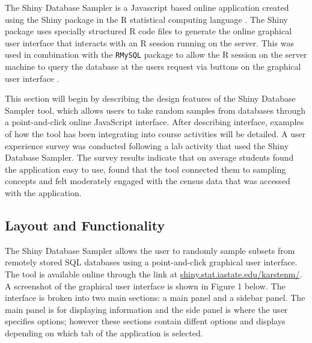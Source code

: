 \documentclass{article}\usepackage[]{graphicx}\usepackage[]{color}
\newcommand{\km}[1]{{\color{Orange} #1}}
\begin{document}
\km{  The Shiny Database Sampler is a Javascript based online application created using the Shiny package in the R statistical computing language \citep{shiny}. The Shiny package uses specially structured R code files to generate the online graphical user interface that interacts with an R session running on the server.  This was used in combination with the \texttt{RMySQL} package to allow the R session on the server machine to query the database at the users request via buttons on the graphical user interface \citep{RMySQL}.  \\  }

\km{  This section will begin by describing the design features of the Shiny Database Sampler tool, which allows users to take random samples from databases through a point-and-click online JavaScript interface.  After describing interface, examples of how the tool has been integrating into course activities will be detailed. A user experience survey was conducted following a lab activity that used the Shiny Database Sampler.  The survey results indicate that on average students found the application easy to use, found that the tool connected them to sampling concepts and felt moderately engaged with the census data that was accessed with the application. \\  }


\subsection{Layout and Functionality}

The Shiny Database Sampler allows the user to randomly sample subsets from remotely stored SQL databases using a point-and-click graphical user interface. The tool is available online through the link at \url{shiny.stat.iastate.edu/karstenm/}.  A screenshot of the graphical user interface is shown in Figure 1 below.  The interface is broken into two main sections: a main panel and a sidebar panel. The main panel is for displaying information and the side panel is where the user specifies options; however these sections contain diffent options and displays depending on which tab of the application is selected.\\
\end{document}
